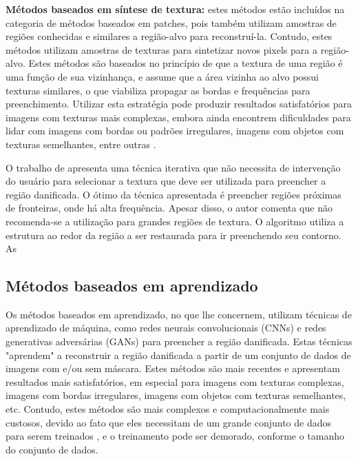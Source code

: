 \begin{list}{}{}
\item \textbf{Métodos baseados em síntese de textura:} \label{texture}
 estes métodos estão incluídos na categoria de métodos baseados em patches, pois também utilizam amostras de regiões conhecidas e similares a região-alvo para reconstruí-la. Contudo, estes métodos utilizam amostras de texturas para sintetizar novos pixels para a região-alvo. Estes métodos são baseados no princípio de que a textura de uma região é uma função de sua vizinhança, e assume que a área vizinha ao alvo possui texturas similares, o que viabiliza propagar as bordas e frequências para preenchimento. Utilizar esta estratégia pode produzir resultados satisfatórios para imagens com texturas mais complexas, embora ainda encontrem dificuldades para lidar com imagens com bordas ou padrões irregulares, imagens com objetos com texturas semelhantes, entre outras \cite{bertalmio2003texture}.
\end{list}

O trabalho de \cite{Bertalmio2000} apresenta uma técnica iterativa que não necessita de intervenção do usuário para selecionar a textura que deve ser utilizada para preencher a região danificada. O ótimo da técnica apresentada é preencher regiões próximas de fronteiras, onde há alta frequência. Apesar disso, o autor comenta que não recomenda-se a utilização para grandes regiões de textura.
O algoritmo utiliza a estrutura ao redor da região a ser restaurada para ir preenchendo seu contorno. As 


\subsection{Métodos baseados em aprendizado} \label{learn-based}
Os métodos baseados em aprendizado, no que lhe concernem, utilizam técnicas de aprendizado de máquina, como redes neurais convolucionais (CNNs) e redes generativas adversárias (GANs) para preencher a região danificada. Estas técnicas "aprendem" a reconstruir a região danificada a partir de um conjunto de dados de imagens com e/ou sem máscara. Estes métodos são mais recentes e apresentam resultados mais satisfatórios, em especial para imagens com texturas complexas, imagens com bordas irregulares, imagens com objetos com texturas semelhantes, etc. Contudo, estes métodos são mais complexos e computacionalmente mais custosos, devido ao fato que eles necessitam de um grande conjunto de dados para serem treinados \cite{Goodfellow-et-al-2016}, e o treinamento pode ser demorado, conforme o tamanho do conjunto de dados.

